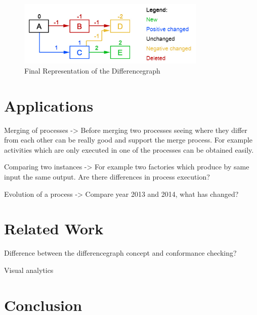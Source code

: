 \documentclass{llncs}
\begin{document}
\begin{figure}
	\centering
	\includegraphics[width=0.8\textwidth]{Images/ColorCodedGraph.PNG}
	\caption{Final Representation of the Differencegraph}
	\label{fig:DiffGraphVisualization}
\end{figure}

\section{Applications}  %
\label{sec:Applications}

Merging of processes -> Before merging two processes seeing where they differ from each other can be really good and support the merge process. For example activities which are only executed in one of the processes can be obtained easily.

Comparing two instances -> For example two factories which produce by same input the same output. Are there differences in process execution?

Evolution of a process -> Compare year 2013 and 2014, what has changed?


\section{Related Work}  %
\label{sec:RelatedWork}

Difference between the differencegraph concept and conformance checking?

Visual analytics


\section{Conclusion} %
\label{sec:Conclusion}




\end{document}
